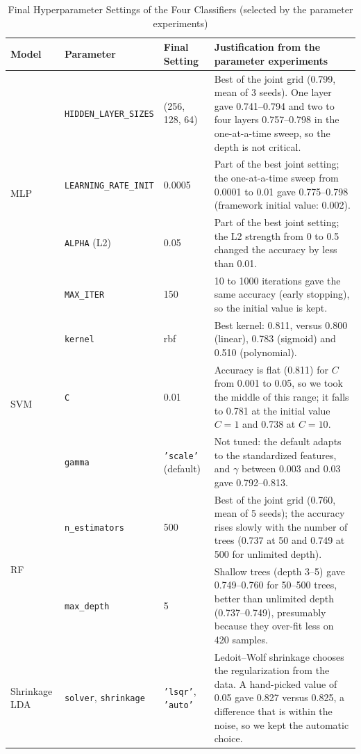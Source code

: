\begin{table}[!htb]
    \centering
    \caption{Final Hyperparameter Settings of the Four Classifiers (selected by the parameter experiments)}
    \label{tab:hyperparams}
    \begin{tabularx}{\textwidth}{@{} l l l X @{}}
        \toprule
        \textbf{Model} & \textbf{Parameter} & \textbf{Final Setting} & \textbf{Justification from the parameter experiments} \\
        \midrule
        \multirow{4}{*}{MLP} & \texttt{HIDDEN\_LAYER\_SIZES} & (256, 128, 64) & Best of the joint grid (0.799, mean of 3 seeds). One layer gave 0.741--0.794 and two to four layers 0.757--0.798 in the one-at-a-time sweep, so the depth is not critical. \\
                             & \texttt{LEARNING\_RATE\_INIT} & 0.0005 & Part of the best joint setting; the one-at-a-time sweep from 0.0001 to 0.01 gave 0.775--0.798 (framework initial value: 0.002). \\
                             & \texttt{ALPHA} (L2) & 0.05 & Part of the best joint setting; the L2 strength from 0 to 0.5 changed the accuracy by less than 0.01. \\
                             & \texttt{MAX\_ITER} & 150 & 10 to 1000 iterations gave the same accuracy (early stopping), so the initial value is kept. \\
        \midrule
        \multirow{3}{*}{SVM} & \texttt{kernel} & rbf & Best kernel: 0.811, versus 0.800 (linear), 0.783 (sigmoid) and 0.510 (polynomial). \\
                             & \texttt{C} & 0.01 & Accuracy is flat (0.811) for $C$ from 0.001 to 0.05, so we took the middle of this range; it falls to 0.781 at the initial value $C=1$ and 0.738 at $C=10$. \\
                             & \texttt{gamma} & \texttt{'scale'} (default) & Not tuned: the default adapts to the standardized features, and $\gamma$ between 0.003 and 0.03 gave 0.792--0.813. \\
        \midrule
        \multirow{2}{*}{RF}  & \texttt{n\_estimators} & 500 & Best of the joint grid (0.760, mean of 5 seeds); the accuracy rises slowly with the number of trees (0.737 at 50 and 0.749 at 500 for unlimited depth). \\
                             & \texttt{max\_depth} & 5 & Shallow trees (depth 3--5) gave 0.749--0.760 for 50--500 trees, better than unlimited depth (0.737--0.749), presumably because they over-fit less on 420 samples. \\
        \midrule
        Shrinkage LDA & \texttt{solver}, \texttt{shrinkage} & \texttt{'lsqr'}, \texttt{'auto'} & Ledoit--Wolf shrinkage chooses the regularization from the data. A hand-picked value of 0.05 gave 0.827 versus 0.825, a difference that is within the noise, so we kept the automatic choice. \\
        \bottomrule
    \end{tabularx}
\end{table}

